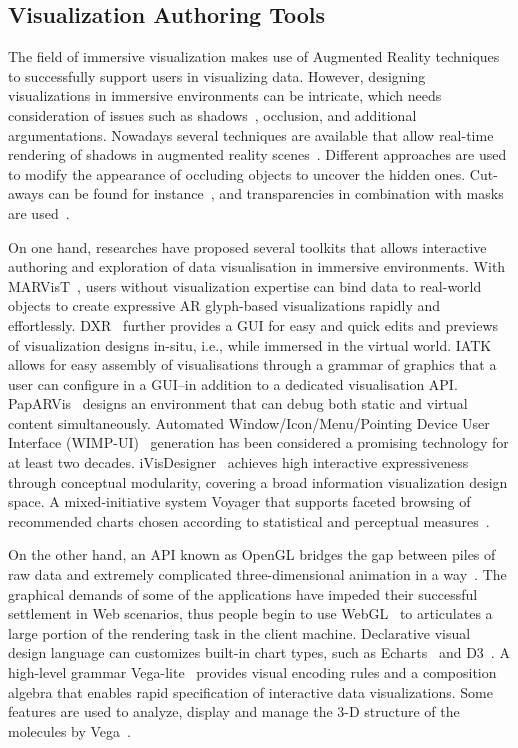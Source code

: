 \subsection{Visualization Authoring Tools}
The field of immersive visualization makes use of Augmented Reality techniques to successfully support users in visualizing data.
However,
designing visualizations in immersive environments can be intricate,
which needs consideration of issues such as shadows~\cite{Allen1999, Mamassian1998, Yonas1978}, occlusion, and additional argumentations.
Nowadays several techniques are available that allow real-time rendering of shadows in augmented reality scenes~\cite{Tsuda2006, Wither2005}.
Different approaches are used to modify the appearance of occluding objects to uncover the hidden ones.
Cut-aways can be found for instance~\cite{Bichlmeier2007, Furmanski2002},
and transparencies in combination with masks are used~\cite{Mendez2009}.

On one hand,
researches have proposed several toolkits that allows interactive authoring and exploration of data visualisation in immersive environments.
With MARVisT~\cite{Chen2020}, users without visualization expertise can bind data to real-world objects to create expressive AR glyph-based visualizations rapidly and effortlessly.
DXR~\cite{Sicat2019} further provides a GUI for easy and quick edits and previews of visualization designs in-situ, i.e., while immersed in the virtual world.
IATK~\cite{Cordeil2019} allows for easy assembly of visualisations through a grammar of graphics that a user can configure in a GUI--in addition to a dedicated visualisation API.
PapARVis~\cite{Chen2020a} designs an environment that can debug both static and virtual content simultaneously.
Automated Window/Icon/Menu/Pointing Device User Interface (WIMP-UI)~\cite{WIMPUI} generation has been considered a promising technology for at least two decades.
iVisDesigner~\cite{Ren2014} achieves high interactive expressiveness through conceptual modularity, covering a broad information visualization design space.
A mixed-initiative system Voyager that supports faceted browsing of recommended charts chosen according to statistical and perceptual measures~\cite{Wongsuphasawat2016}.

On the other hand,
an API known as OpenGL bridges the gap between piles of raw data and extremely complicated three-dimensional animation in a way~\cite{Shreiner2013}.
The graphical demands of some of the applications have impeded their successful settlement in Web scenarios,
thus people begin to use WebGL~\cite{Parisi2012} to articulates a large portion of the rendering task in the client machine.
Declarative visual design language can customizes built-in chart types, such as Echarts~\cite{Li2018} and D3~\cite{Zhu2013}.
A high-level grammar Vega-lite~\cite{Satyanarayan2017} provides visual encoding rules and a composition algebra that enables rapid specification of interactive data visualizations.
Some features are used to analyze, display and manage the 3-D structure of the molecules by Vega~\cite{Pedretti2002}.


